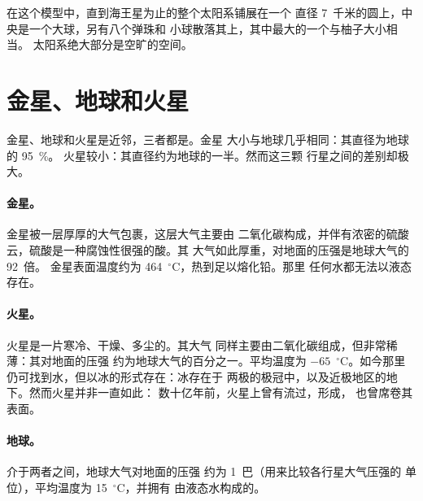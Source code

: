 在这个模型中，直到海王星为止的整个太阳系铺展在一个
直径 7~千米的圆上，中央是一个大球，另有八个弹珠和
小球散落其上，其中最大的一个与柚子大小相当。
太阳系绝大部分是空旷的空间。

\section{金星、地球和火星}

金星、地球和火星是近邻，三者都是。金星
大小与地球几乎相同：其直径为地球的 95~\%。
火星较小：其直径约为地球的一半。然而这三颗
行星之间的差别却极大。

\paragraph{金星。}金星被一层厚厚的大气包裹，这层大气主要由
二氧化碳构成，并伴有浓密的硫酸云，硫酸是一种腐蚀性很强的酸。其
大气如此厚重，对地面的压强是地球大气的 92~倍。
金星表面温度约为
464~$^\circ$C，热到足以熔化铅。那里
任何水都无法以液态存在。

\paragraph{火星。}火星是一片寒冷、干燥、多尘的。其大气
同样主要由二氧化碳组成，但非常稀薄：其对地面的压强
约为地球大气的百分之一。平均温度为
$-65$~$^\circ$C。如今那里仍可找到水，但以冰的形式存在：冰存在于
两极的极冠中，以及近极地区的地下。然而火星并非一直如此：
数十亿年前，火星上曾有流过，形成，
也曾席卷其表面。

\paragraph{地球。}介于两者之间，地球大气对地面的压强
约为 1~巴（用来比较各行星大气压强的
单位），平均温度为 15~$^\circ$C，并拥有
由液态水构成的。

